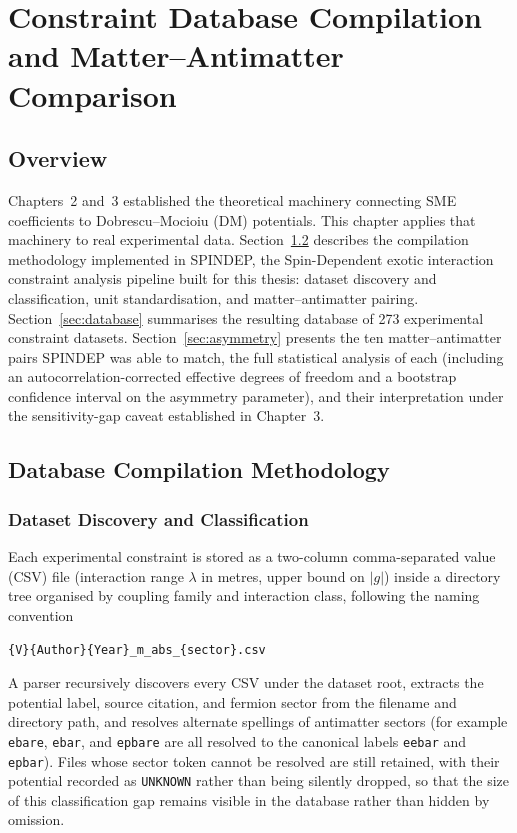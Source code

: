 \documentclass[main]{subfiles}
\begin{document}
\ifSubfilesClassLoaded{\setcounter{chapter}{3}}{}
\chapter{Constraint Database Compilation and Matter--Antimatter Comparison}

\section{Overview}

Chapters~2 and~3 established the theoretical machinery connecting SME
coefficients to Dobrescu--Mocioiu (DM) potentials. This chapter applies that
machinery to real experimental data. Section~\ref{sec:methodology} describes
the compilation methodology implemented in SPINDEP, the Spin-Dependent
exotic interaction constraint analysis pipeline built for this thesis:
dataset discovery and classification, unit standardisation, and
matter--antimatter pairing. Section~\ref{sec:database} summarises the
resulting database of 273 experimental constraint datasets. Section~\ref{sec:asymmetry}
presents the ten matter--antimatter pairs SPINDEP was able to match, the
full statistical analysis of each (including an autocorrelation-corrected
effective degrees of freedom and a bootstrap confidence interval on the
asymmetry parameter), and their interpretation under the sensitivity-gap
caveat established in Chapter~3.

\section{Database Compilation Methodology}
\label{sec:methodology}

\subsection{Dataset Discovery and Classification}

Each experimental constraint is stored as a two-column comma-separated
value (CSV) file (interaction range $\lambda$ in metres, upper bound on
$|g|$) inside a directory tree
organised by coupling family and interaction class, following the naming
convention
\begin{center}
\texttt{\{V\}\{Author\}\{Year\}\_m\_abs\_\{sector\}.csv}
\end{center}
A parser recursively discovers every CSV under the dataset root, extracts
the potential label, source citation, and fermion sector from the filename
and directory path, and resolves alternate spellings of antimatter sectors
(for example \texttt{ebare}, \texttt{ebar}, and \texttt{epbare} are all
resolved to the canonical labels \texttt{eebar} and \texttt{epbar}). Files
whose sector token cannot be resolved are still retained, with their
potential recorded as \texttt{UNKNOWN} rather than being silently dropped,
so that the size of this classification gap remains visible in the
database rather than hidden by omission.
\end{document}
